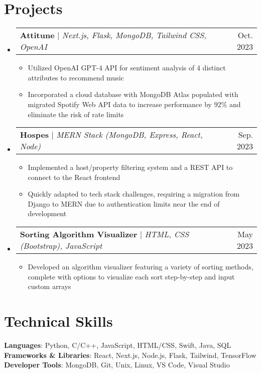 \documentclass[letterpaper,12pt]{article}
\makeatletter
\newcommand{\resumeItem}[1]{
  \item\small{
    {#1 \vspace{-2pt}}
  }
}
\newcommand{\resumeProjectHeading}[2]{
    \item
    \begin{tabular*}{0.97\textwidth}{l@{\extracolsep{\fill}}r}
      \small#1 & #2 \\
    \end{tabular*}\vspace{-7pt}
}
\newcommand{\resumeSubHeadingListStart}{\begin{itemize}[leftmargin=0.15in, label={}]}
\newcommand{\resumeSubHeadingListEnd}{\end{itemize}}
\newcommand{\resumeItemListStart}{\begin{itemize}}
\newcommand{\resumeItemListEnd}{\end{itemize}\vspace{-5pt}}
\makeatother
\begin{document}
\section{Projects}
    \resumeSubHeadingListStart
      \resumeProjectHeading
          {\textbf{Attitune} $|$ \emph{Next.js, Flask, MongoDB, Tailwind CSS, OpenAI}}{Oct. 2023}
          \resumeItemListStart
            \resumeItem{Utilized OpenAI GPT-4 API for sentiment analysis of 4 distinct attributes to recommend
            music}
            \resumeItem{Incorporated a cloud database with MongoDB Atlas populated with migrated Spotify Web API data to increase performance by 92\% and eliminate the risk of rate limits}
          \resumeItemListEnd
      \resumeProjectHeading
          {\textbf{Hospes} $|$ \emph{MERN Stack (MongoDB, Express, React, Node)}}{Sep. 2023}
          \resumeItemListStart
            \resumeItem{Implemented a host/property filtering system and a REST API to connect to the React frontend}
            \resumeItem{Quickly adapted to tech stack challenges, requiring a migration from Django to MERN due to authentication limits near the end of development}
          \resumeItemListEnd
      \resumeProjectHeading
          {\textbf{Sorting Algorithm Visualizer} $|$ \emph{HTML, CSS (Bootstrap), JavaScript}}{May 2023}
          \resumeItemListStart
            \resumeItem{Developed an algorithm visualizer featuring a variety of sorting methods, complete with options to visualize each sort step-by-step and input custom arrays}
          \resumeItemListEnd
    \resumeSubHeadingListEnd


\section{Technical Skills}
 \begin{itemize}[leftmargin=0.15in, label={}]
    \small{\item{
     \textbf{Languages}{: Python, C/C++, JavaScript, HTML/CSS, Swift, Java, SQL} \\
     \textbf{Frameworks \& Libraries}{: React, Next.js, Node.js, Flask, Tailwind, TensorFlow} \\
     \textbf{Developer Tools}{: MongoDB, Git, Unix, Linux, VS Code, Visual Studio} \\
    }}
 \end{itemize}
\end{document}
